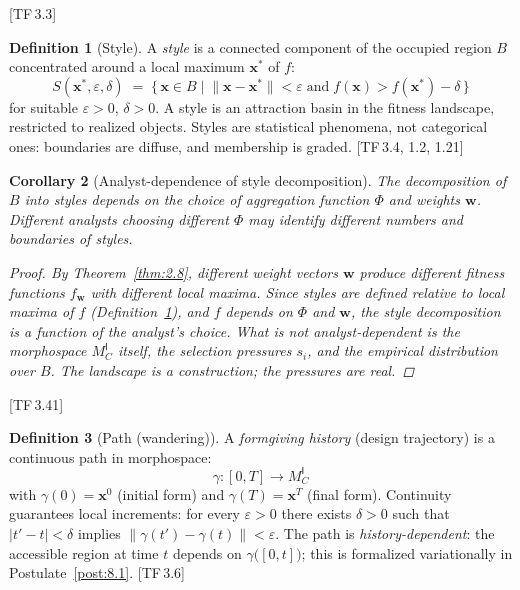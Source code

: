 \documentclass[10pt]{article}
\theoremstyle{definition}
\newtheorem{definition}{Definition}[section]
\theoremstyle{plain}
\newtheorem{corollary}[definition]{Corollary}
\theoremstyle{remark}
\newcommand{\MC}{M^{\mathsf{I}}_C}          %
\newcommand{\norm}[1]{\lVert #1 \rVert}
\newcommand{\TF}[1]{\textnormal{[TF\,#1]}}  %
\begin{document}
\TF{3.3}

\begin{definition}[Style]\label{def:3.4}
A \emph{style} is a connected component of the occupied region $B$
concentrated around a local maximum $\bm{x}^*$ of $f$:
\[
  S(\bm{x}^*, \varepsilon, \delta) \;=\;
  \bigl\{\, \bm{x} \in B \;\big|\;
    \norm{\bm{x} - \bm{x}^*} < \varepsilon
    \;\text{and}\;
    f(\bm{x}) > f(\bm{x}^*) - \delta
  \,\bigr\}
\]
for suitable $\varepsilon > 0$, $\delta > 0$. A style is an attraction
basin in the fitness landscape, restricted to realized objects.
Styles are statistical phenomena, not categorical ones: boundaries are
diffuse, and membership is graded. \TF{3.4, 1.2, 1.21}
\end{definition}

\begin{corollary}[Analyst-dependence of style decomposition]%
\label{cor:3.5}
The decomposition of $B$ into styles depends on the choice of
aggregation function $\Phi$ and weights $\bm{w}$. Different analysts
choosing different $\Phi$ may identify different numbers and boundaries
of styles.

\begin{proof}
By Theorem~\ref{thm:2.8}, different weight vectors $\bm{w}$ produce
different fitness functions $f_{\bm{w}}$ with different local maxima.
Since styles are defined relative to local maxima of $f$
(Definition~\ref{def:3.4}), and $f$ depends on $\Phi$ and $\bm{w}$,
the style decomposition is a function of the analyst's choice.
What is \emph{not} analyst-dependent is the morphospace $\MC$ itself,
the selection pressures $s_i$, and the empirical distribution over $B$.
The landscape is a construction; the pressures are real. \qedhere
\end{proof}
\end{corollary}

\TF{3.41}

\begin{definition}[Path (wandering)]\label{def:3.6}
A \emph{formgiving history} (design trajectory) is a continuous path
in morphospace:
\[
  \gamma : [0, T] \longrightarrow \MC
\]
with $\gamma(0) = \bm{x}^0$ (initial form) and $\gamma(T) = \bm{x}^T$
(final form). Continuity guarantees local increments:
for every $\varepsilon > 0$ there exists $\delta > 0$ such that
$|t' - t| < \delta$ implies
$\norm{\gamma(t') - \gamma(t)} < \varepsilon$.
The path is \emph{history-dependent}: the accessible region at time $t$
depends on $\gamma\bigl([0, t]\bigr)$; this is formalized
variationally in Postulate~\ref{post:8.1}. \TF{3.6}
\end{definition}
\end{document}
